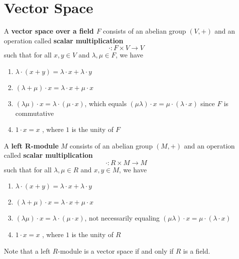 \section{Vector Space}

  \begin{definition}
     A \textbf{vector space over a field $F$} consists of an abelian group $(V, +)$ and an operation called \textbf{scalar multiplication} 
     \begin{equation}
       \cdot: F \times V \rightarrow V
     \end{equation}
    such that for all $x, y\in V$ and $\lambda, \mu \in F$, we have 
    \begin{enumerate}
      \item $\lambda \cdot (x + y) = \lambda \cdot x + \lambda \cdot y$
      \item $(\lambda + \mu) \cdot x = \lambda \cdot x + \mu \cdot x$ 
      \item $(\lambda \mu) \cdot x = \lambda \cdot (\mu \cdot x )$, which equals $(\mu \lambda) \cdot x = \mu \cdot (\lambda \cdot x)$ since $F$ is commutative 
      \item $1 \cdot x = x$ , where $1$ is the unity of $F$
    \end{enumerate}
  \end{definition}

  \begin{definition}
    A \textbf{left R-module} $M$ consists of an abelian group $(M, +)$ and an operation called \textbf{scalar multiplication}
    \begin{equation}
      \cdot: R \times M \longrightarrow M
    \end{equation}
    such that for all $\lambda, \mu \in R$ and $x, y \in M$, we have 
    \begin{enumerate}
      \item $\lambda \cdot (x + y) = \lambda \cdot x + \lambda \cdot y$
      \item $(\lambda + \mu) \cdot x = \lambda \cdot x + \mu \cdot x$ 
      \item $(\lambda \mu) \cdot x = \lambda \cdot (\mu \cdot x )$, not necessarily equaling $(\mu \lambda) \cdot x = \mu \cdot (\lambda \cdot x)$
      \item $1 \cdot x = x$ , where $1$ is the unity of $R$
    \end{enumerate}
    Note that a left $R$-module is a vector space if and only if $R$ is a field.
  \end{definition}

